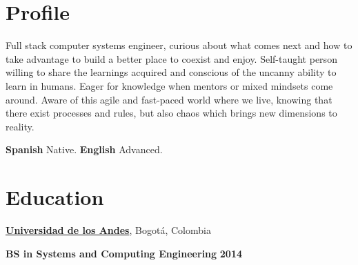 \section{Profile}
Full stack computer systems engineer, curious about what comes next and how to
take advantage to build a better place to coexist and enjoy.
Self-taught person willing to share
the learnings acquired and
conscious of the uncanny ability to learn in humans. Eager for knowledge when
mentors or mixed mindsets come around.
Aware of this agile and fast-paced world where we live, knowing that there exist
processes and rules, but also chaos which brings new dimensions to reality.

\vspace{3.5mm}
\textbf{Spanish} Native. \textbf{English} Advanced.
%

%

\section{Education}
%
% 
% 
\href{http://www.uniandes.edu.co/}{\textbf{Universidad de los Andes}},
Bogot\'{a}, Colombia
\begin{outerlist}
\item[] \textbf{BS in Systems and Computing Engineering} \hfill \textbf{2014}
\end{outerlist}

